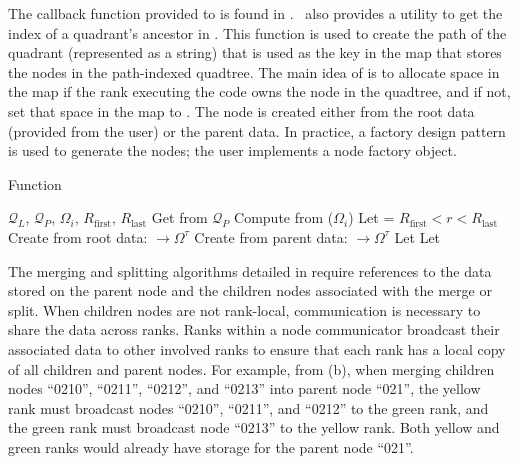 The callback function provided to  is found in . \pforest\ also provides a utility to get the index of a quadrant's ancestor in . This function is used to create the path of the quadrant (represented as a string) that is used as the key in the map that stores the nodes in the path-indexed quadtree. The main idea of  is to allocate space in the map if the rank executing the code owns the node in the quadtree, and if not, set that space in the map to . The node is created either from the root data (provided from the user) or the parent data. In practice, a factory design pattern is used to generate the nodes; the user implements a node factory object.

\begin{algorithm}
    \caption{ Function}
    \begin{algorithmic}[0]
        \Require $\mathcal{Q}_{L}$, $\mathcal{Q}_{P}$, $\Omega_i$, $R_{\text{first}}$, $R_{\text{last}}$
        \State Get  from $\mathcal{Q}_{P}$
        \State Compute  from ($\Omega_i$)
        \State Let  = $R_{\text{first}} < r < R_{\text{last}}$
                \State Create  from root data:  $\rightarrow \Omega^{\tau}$
            \Else
                \State Create  from parent data:  $\rightarrow \Omega^{\tau}$
            \EndIf
            \State Let 
        \Else
            \State Let 
        \EndIf
    \end{algorithmic}
    \label{alg:p4est_search_all_callback}
\end{algorithm}

The merging and splitting algorithms detailed in  require references to the data stored on the parent node and the children nodes associated with the merge or split. When children nodes are not rank-local, communication is necessary to share the data across ranks. Ranks within a node communicator broadcast their associated data to other involved ranks to ensure that each rank has a local copy of all children and parent nodes. For example, from (b), when merging children nodes ``0210'', ``0211'', ``0212'', and ``0213'' into parent node ``021'', the yellow rank must broadcast nodes ``0210'', ``0211'', and ``0212'' to the green rank, and the green rank must broadcast node ``0213'' to the yellow rank. Both yellow and green ranks would already have storage for the parent node ``021''.


